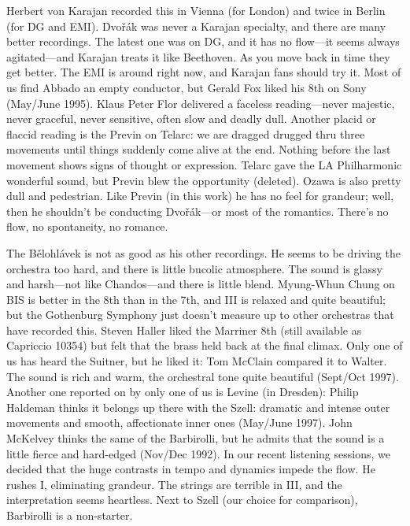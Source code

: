 \documentclass[12pt]{article}%
\begin{document}
Herbert von Karajan recorded this in Vienna (for London) and twice in Berlin (for
DG and EMI). Dvořák was never a Karajan specialty, and there are many better recordings.
The latest one was on DG, and it has no flow---it seems always agitated---and Karajan treats it like Beethoven. As you move back in time they get better. The EMI is around right now, and
Karajan fans should try it. Most of us find Abbado an empty conductor,
but Gerald Fox liked his 8th on Sony (May/June 1995).
Klaus Peter Flor delivered a faceless reading---never majestic, never graceful, never sensitive, often slow and deadly dull. Another placid or flaccid reading is the Previn on Telarc: we are dragged drugged thru three movements until things suddenly come alive at the end. Nothing before the last movement shows signs of thought or expression. Telarc gave the LA Philharmonic wonderful sound, but Previn blew the opportunity (deleted).
Ozawa is also pretty dull and pedestrian. Like Previn (in this work) he has no feel for grandeur; well, then he shouldn't be conducting Dvořák---or most of the romantics. There's no flow, no spontaneity, no romance.

The Bělohlávek is not as good as his other recordings. He seems to be driving the orchestra too hard, and there is little bucolic atmosphere. The sound is glassy and harsh---not like Chandos---and there is little blend.
Myung-Whun Chung on BIS is better in the 8th than in the 7th, and III is relaxed and quite beautiful; but the Gothenburg Symphony just doesn't measure up to other orchestras that have recorded this. Steven Haller liked the Marriner 8th (still available as Capriccio 10354) but felt that the brass held back at the final climax. Only one of us has heard the Suitner, but he liked it: Tom McClain compared it to Walter. The sound is rich and warm, the orchestral tone quite beautiful (Sept/Oct 1997). Another one reported on by only one of us is Levine (in Dresden): Philip Haldeman thinks it belongs up there with the Szell: dramatic and intense outer movements and smooth, affectionate inner ones (May/June 1997). John McKelvey thinks the same of the Barbirolli, but he admits that the sound is a little fierce and hard-edged (Nov/Dec 1992). In our recent listening sessions, we decided that the huge contrasts in tempo and dynamics impede the flow. He rushes I, eliminating grandeur. The strings are terrible in III, and the interpretation seems heartless. Next to Szell (our choice for comparison), Barbirolli is a non-starter.
\end{document}
